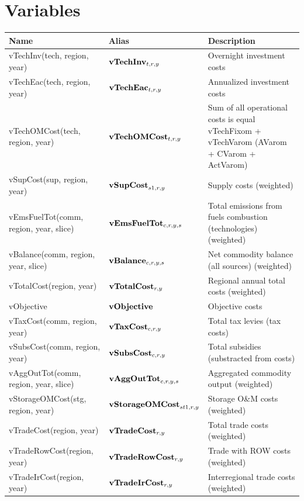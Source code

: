 \documentclass{article}
\begin{document}
\section*{Variables}
\begin{longtable}{|p{10cm}|p{5cm}|p{9cm}|}
\hline
\bf{Name} & \bf{Alias}   & \bf{Description} \\ 
 \hline
vTechInv(tech, region, year) & ${\bf vTechInv}_{t,r,y}$ & Overnight investment costs \\ 
 \hline
vTechEac(tech, region, year) & ${\bf vTechEac}_{t,r,y}$ & Annualized investment costs \\ 
 \hline
vTechOMCost(tech, region, year) & ${\bf vTechOMCost}_{t,r,y}$ & Sum of all operational costs is equal vTechFixom + vTechVarom (AVarom + CVarom + ActVarom) \\ 
 \hline
vSupCost(sup, region, year) & ${\bf vSupCost}_{s1,r,y}$ & Supply costs (weighted) \\ 
 \hline
vEmsFuelTot(comm, region, year, slice) & ${\bf vEmsFuelTot}_{c,r,y,s}$ & Total emissions from fuels combustion (technologies) (weighted) \\ 
 \hline
vBalance(comm, region, year, slice) & ${\bf vBalance}_{c,r,y,s}$ & Net commodity balance (all sources) (weighted) \\ 
 \hline
vTotalCost(region, year) & ${\bf vTotalCost}_{r,y}$ & Regional annual total costs (weighted) \\ 
 \hline
vObjective & ${\bf vObjective}$ & Objective costs \\ 
 \hline
vTaxCost(comm, region, year) & ${\bf vTaxCost}_{c,r,y}$ & Total tax levies (tax costs) \\ 
 \hline
vSubsCost(comm, region, year) & ${\bf vSubsCost}_{c,r,y}$ & Total subsidies (substracted from costs) \\ 
 \hline
vAggOutTot(comm, region, year, slice) & ${\bf vAggOutTot}_{c,r,y,s}$ & Aggregated commodity output (weighted) \\ 
 \hline
vStorageOMCost(stg, region, year) & ${\bf vStorageOMCost}_{st1,r,y}$ & Storage O\&M costs (weighted) \\ 
 \hline
vTradeCost(region, year) & ${\bf vTradeCost}_{r,y}$ & Total trade costs (weighted) \\ 
 \hline
vTradeRowCost(region, year) & ${\bf vTradeRowCost}_{r,y}$ & Trade with ROW costs (weighted) \\ 
 \hline
vTradeIrCost(region, year) & ${\bf vTradeIrCost}_{r,y}$ & Interregional trade costs (weighted) \\ 
 \hline
\end{longtable}
\end{document}
